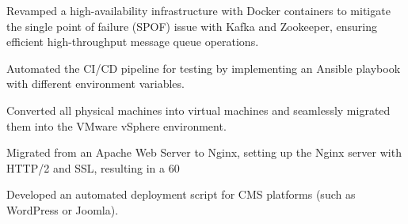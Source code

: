 \documentclass[]{deedy-resume-openfont}
\begin{document}
\begin{minipage}[t]{1\textwidth}
\null\hfill{}
\begin{tightemize}
    \item Revamped a high-availability infrastructure with Docker containers to mitigate the single point of failure (SPOF) issue with Kafka and Zookeeper, ensuring efficient high-throughput message queue operations.
    \item Automated the CI/CD pipeline for testing by implementing an Ansible playbook with different environment variables.
\end{tightemize}
\sectionsep

\null\hfill{}
\begin{tightemize}
    \item Converted all physical machines into virtual machines and seamlessly migrated them into the VMware vSphere environment.
    \item Migrated from an Apache Web Server to Nginx, setting up the Nginx server with HTTP/2 and SSL, resulting in a 60%
    \item Developed an automated deployment script for CMS platforms (such as WordPress or Joomla).
\end{tightemize}



\end{minipage}
%
%
\end{document}
